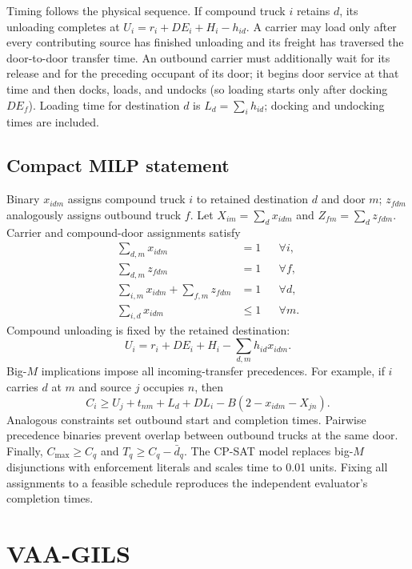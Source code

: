 \documentclass[11pt,a4paper]{article}
\begin{document}
Timing follows the physical sequence. If compound truck $i$ retains $d$, its
unloading completes at
$U_i=r_i+DE_i+H_i-h_{id}$. A carrier may load only after every contributing
source has finished unloading and its freight has traversed the door-to-door
transfer time. An outbound carrier must additionally wait for its release and
for the preceding occupant of its door; it begins door service at that time and
then docks, loads, and undocks (so loading starts only after docking $DE_f$).
Loading time for destination $d$ is
$L_d=\sum_i h_{id}$; docking and undocking times are included.

\subsection{Compact MILP statement}

Binary $x_{idm}$ assigns compound truck $i$ to retained destination $d$ and
door $m$; $z_{fdm}$ analogously assigns outbound truck $f$. Let
$X_{im}=\sum_d x_{idm}$ and $Z_{fm}=\sum_d z_{fdm}$. Carrier and compound-door
assignments satisfy
\begin{align}
 \sum_{d,m}x_{idm}&=1 &&\forall i, \\
 \sum_{d,m}z_{fdm}&=1 &&\forall f, \\
 \sum_{i,m}x_{idm}+\sum_{f,m}z_{fdm}&=1 &&\forall d, \\
 \sum_{i,d}x_{idm}&\le1 &&\forall m.
\end{align}
Compound unloading is fixed by the retained destination:
\begin{equation}
 U_i=r_i+DE_i+H_i-\sum_{d,m}h_{id}x_{idm}. \label{eq:unload}
\end{equation}
Big-$M$ implications impose all incoming-transfer precedences. For example,
if $i$ carries $d$ at $m$ and source $j$ occupies $n$, then
\begin{equation}
C_i\ge U_j+t_{nm}+L_d+DL_i-B(2-x_{idm}-X_{jn}).
\label{eq:transfer}
\end{equation}
Analogous constraints set outbound start and completion times. Pairwise
precedence binaries prevent overlap between outbound trucks at the same door.
Finally, $C_{\max}\ge C_q$ and $T_q\ge C_q-\bar d_q$. The CP-SAT model replaces
big-$M$ disjunctions with enforcement literals and scales time to 0.01 units.
Fixing all assignments to a feasible schedule reproduces the independent
evaluator's completion times.

\section{VAA-GILS}
\end{document}
